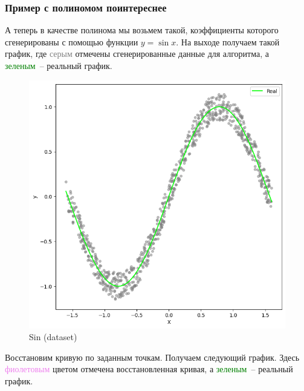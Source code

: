 \documentclass[12pt, a4paper, oneside, final]{article}
\begin{document}
	\subsubsection*{Пример с полиномом поинтереснее}
	А теперь в качестве полинома мы возьмем такой, коэффициенты которого сгенерированы с помощью функции $y = \sin{x}$.
	На выходе получаем такой график, где \textcolor{gray}{серым} отмечены сгенерированные данные для алгоритма, а \textcolor{green}{зеленым}~-- реальный график.
	\begin{figure}[H]
		\centering
		\includegraphics[scale = 0.8]{Image/AT1_SIN_DATASET.png}
		\caption*{Sin (dataset)}
	\end{figure}
	Восстановим кривую по заданным точкам.
	Получаем следующий график.
	Здесь \textcolor{violet}{фиолетовым} цветом отмечена восстановленная кривая, а \textcolor{green}{зеленым}~-- реальный график.
\end{document}
